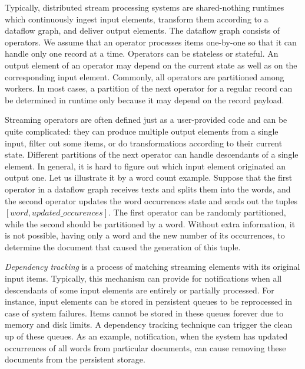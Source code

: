 \label {fs-acker-motivation}

Typically, distributed stream processing systems are shared-nothing runtimes which continuously ingest input elements, transform them according to a dataflow graph, and deliver output elements. The dataflow graph consists of operators. We assume that an operator processes items one-by-one so that it can handle only one record at a time. Operators can be stateless or stateful. An output element of an operator may depend on the current state as well as on the corresponding input element. Commonly, all operators are partitioned among workers. In most cases, a partition of the next operator for a regular record can be determined in runtime only because it may depend on the record payload. 

Streaming operators are often defined just as a user-provided code and can be quite complicated: they can produce multiple output elements from a single input, filter out some items, or do transformations according to their current state. Different partitions of the next operator can handle descendants of a single element. In general, it is hard to figure out which input element originated an output one. Let us illustrate it by a word count example. Suppose that the first operator in a dataflow graph receives texts and splits them into the words, and the second operator updates the word occurrences state and sends out the tuples $[word, updated\_occurences]$. The first operator can be randomly partitioned, while the second should be partitioned by a word. Without extra information, it is not possible, having only a word and the new number of its occurrences, to determine the document that caused the generation of this tuple.

{\em Dependency tracking} is a process of matching streaming elements with its original input items. Typically, this mechanism can provide for notifications when all descendants of some input elements are entirely or partially processed. For instance, input elements can be stored in persistent queues to be reprocessed in case of system failures. Items cannot be stored in these queues forever due to memory and disk limits. A dependency tracking technique can trigger the clean up of these queues. As an example, notification, when the system has updated occurrences of all words from particular documents, can cause removing these documents from the persistent storage.

